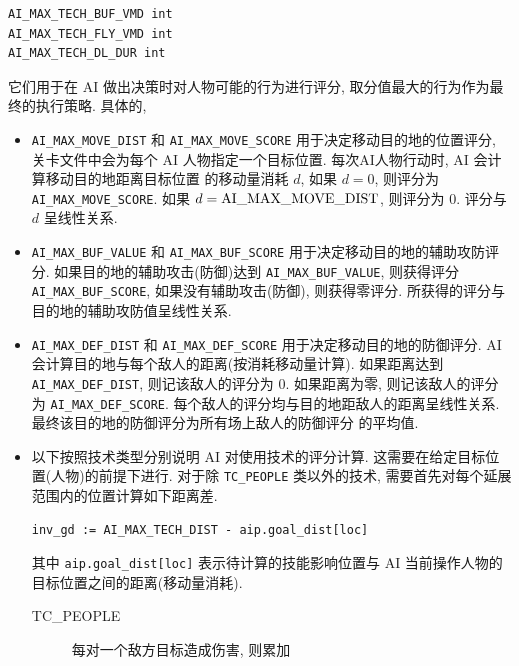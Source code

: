 \documentclass[UTF8, zihao=-4]{ctexart} %
\newcommand{\lcode}{\lstinline} % 段内插入代码
\begin{document}
\begin{enumerate}
\begin{lstlisting}
AI_MAX_TECH_BUF_VMD int
AI_MAX_TECH_FLY_VMD int
AI_MAX_TECH_DL_DUR int
            \end{lstlisting}
            它们用于在 AI 做出决策时对人物可能的行为进行评分, 取分值最大的行为作为最终的执行策略. 具体的,
            \begin{itemize}
                  \item \lcode{AI_MAX_MOVE_DIST} 和 \lcode{AI_MAX_MOVE_SCORE} 用于决定移动目的地的位置评分, 
                        关卡文件中会为每个 AI 人物指定一个目标位置. 每次AI人物行动时, AI 会计算移动目的地距离目标位置
                        的移动量消耗 $d$, 如果 $d = 0$, 则评分为 \lcode{AI_MAX_MOVE_SCORE}.
                        如果 $d = \text{\lcode{AI_MAX_MOVE_DIST}}$, 则评分为 $0$. 评分与 $d$ 呈线性关系.
                  \item \lcode{AI_MAX_BUF_VALUE} 和 \lcode{AI_MAX_BUF_SCORE} 用于决定移动目的地的辅助攻防评分.
                        如果目的地的辅助攻击(防御)达到 \lcode{AI_MAX_BUF_VALUE}, 则获得评分 \lcode{AI_MAX_BUF_SCORE},
                        如果没有辅助攻击(防御), 则获得零评分. 所获得的评分与目的地的辅助攻防值呈线性关系.
                  \item \lcode{AI_MAX_DEF_DIST} 和 \lcode{AI_MAX_DEF_SCORE} 用于决定移动目的地的防御评分.
                        AI 会计算目的地与每个敌人的距离(按消耗移动量计算). 如果距离达到 \lcode{AI_MAX_DEF_DIST},
                        则记该敌人的评分为 $0$. 如果距离为零, 则记该敌人的评分为 \lcode{AI_MAX_DEF_SCORE}.
                        每个敌人的评分均与目的地距敌人的距离呈线性关系. 最终该目的地的防御评分为所有场上敌人的防御评分
                        的平均值.
                  \item 以下按照技术类型分别说明 AI 对使用技术的评分计算. 这需要在给定目标位置(人物)的前提下进行.
                        对于除 \lcode{TC_PEOPLE} 类以外的技术, 需要首先对每个延展范围内的位置计算如下距离差.
                        \begin{lstlisting}
inv_gd := AI_MAX_TECH_DIST - aip.goal_dist[loc]
                        \end{lstlisting}
                        其中 \lcode{aip.goal_dist[loc]} 表示待计算的技能影响位置与 AI 当前操作人物的目标位置之间的距离(移动量消耗).
                        \begin{description}
                              \item [TC\_PEOPLE]
                                    每对一个敌方目标造成伤害, 则累加
                                    \begin{lstlisting}

\end{lstlisting}
\end{description}
\end{itemize}
\end{enumerate}
\end{document}
